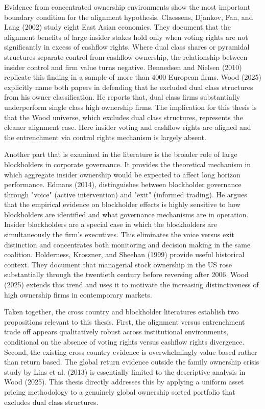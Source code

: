 Evidence from concentrated ownership environments show the most important boundary condition for the alignment hypothesis. Claessens, Djankov, Fan, and Lang (2002) study eight East Asian economies. They document that the alignment benefits of large insider stakes hold only when voting rights are not significantly in excess of cashflow rights. Where dual class shares or pyramidal structures separate control from cashflow ownership, the relationship between insider control and firm value turns negative. Bennedsen and Nielsen (2010) replicate this finding in a sample of more than 4000 European firms. Wood (2025) explicitly name both papers in defending that he excluded dual class structures from his owner classification. He reports that, dual class firms substantially underperform single class high ownership firms. The implication for this thesis is that the Wood universe, which excludes dual class structures, represents the cleaner alignment case. Here insider voting and cashflow rights are aligned and the entrenchment via control rights mechanism is largely absent.

Another part that is examined in the literature is the broader role of large blockholders in corporate governance. It provides the theoretical mechanism in which aggregate insider ownership would be expected to affect long horizon performance. Edmans (2014), distinguishes between blockholder governance through "voice" (active intervention) and "exit" (informed trading). He argues that the empirical evidence on blockholder effects is highly sensitive to how blockholders are identified and what governance mechanisms are in operation. Insider blockholders are a special case in which the blockholders are simultaneously the firm's executives. This eliminates the voice versus exit distinction and concentrates both monitoring and decision making in the same coalition. Holderness, Kroszner, and Sheehan (1999) provide useful historical context. They document that managerial stock ownership in the US rose substantially through the twentieth century before reversing after 2006. Wood (2025) extends this trend and uses it to motivate the increasing distinctiveness of high ownership firms in contemporary markets.

Taken together, the cross country and blockholder literatures establish two propositions relevant to this thesis. First, the alignment versus entrenchment trade off appears qualitatively robust across institutional environments, conditional on the absence of voting rights versus cashflow rights divergence. Second, the existing cross country evidence is overwhelmingly value based rather than return based. The global return evidence outside the family ownership crisis study by Lins et al. (2013) is essentially limited to the descriptive analysis in Wood (2025). This thesis directly addresses this by applying a uniform asset pricing methodology to a genuinely global ownership sorted portfolio that excludes dual class structures.


